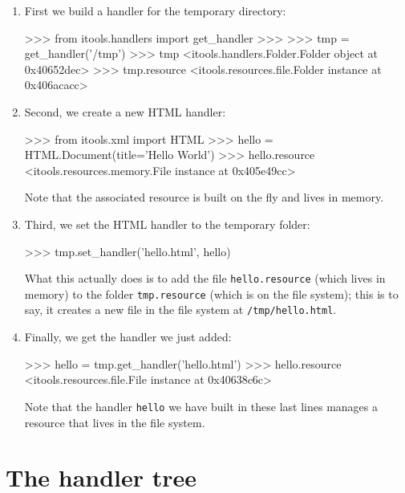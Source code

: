 \begin{enumerate}
  \item First we build a handler for the temporary directory:

\begin{code}
    >>> from itools.handlers import get_handler
    >>>
    >>> tmp = get_handler('/tmp')
    >>> tmp
    <itools.handlers.Folder.Folder object at 0x40652dec>
    >>> tmp.resource
    <itools.resources.file.Folder instance at 0x406acacc>
\end{code}

  \item Second, we create a new HTML handler:

\begin{code}
    >>> from itools.xml import HTML
    >>> hello = HTML.Document(title='Hello World')
    >>> hello.resource
    <itools.resources.memory.File instance at 0x405e49cc>
\end{code}

    Note that the associated resource is built on the fly and lives in memory.

  \item Third, we set the HTML handler to the temporary folder:

\begin{code}
    >>> tmp.set_handler('hello.html', hello)
\end{code}

    What this actually does is to add the file {\tt hello.resource} (which
    lives in memory) to the folder {\tt tmp.resource} (which is on the
    file system); this is to say, it creates a new file in the file system
    at {\tt /tmp/hello.html}.

  \item Finally, we get the handler we just added:

\begin{code}
    >>> hello = tmp.get_handler('hello.html')
    >>> hello.resource
    <itools.resources.file.File instance at 0x40638c6c>
\end{code}

    Note that the handler {\tt hello} we have built in these last lines
    manages a resource that lives in the file system.

\end{enumerate}



\section{The handler tree}

